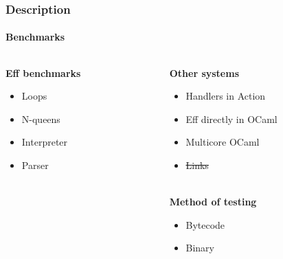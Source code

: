 \documentclass{beamer}
\begin{document}

%


\begin{frame}[fragile]
\frametitle{Description}
\framesubtitle{Benchmarks}
\begin{columns}[T] %
\begin{column}{.48\textwidth}
	
	\textbf{Eff benchmarks}
	\begin{itemize}
	\item Loops
	\item N-queens
	\item Interpreter \cite{interpreter}
	\item Parser \cite{scope}
	\end{itemize}	
	
\end{column}%
\hfill%
\begin{column}{.48\textwidth}

	\textbf{Other systems}
	\begin{itemize}
	\item Handlers in Action \cite{handlersinaction} \cite{delimccweb}
	\item Eff directly in OCaml \cite{directly} \cite{delimccweb}
	\item Multicore OCaml \cite{multicore}
	\item \sout{Links} \cite{linkslang} \cite{links} \cite{Hillerstrom:2016:LER:2976022.2976033}
	\end{itemize} \mbox{}\\
	
	\textbf{Method of testing}
	\begin{itemize}
	\item Bytecode
	\item Binary
	\end{itemize}

\end{column}%
\end{columns}
\end{frame}
\end{document}
